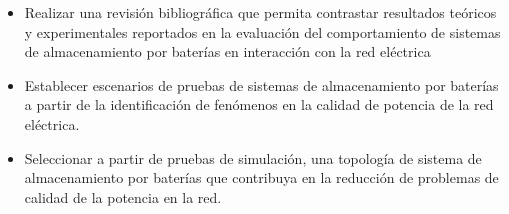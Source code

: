 
\begin{itemize}
    \item Realizar una revisión bibliográfica que permita contrastar resultados teóricos y experimentales reportados en la evaluación del comportamiento de sistemas de almacenamiento por baterías en interacción con la red eléctrica
    \item Establecer escenarios de pruebas de sistemas de almacenamiento por baterías a partir de la identificación de fenómenos en la calidad de potencia de la red eléctrica.
    \item Seleccionar a partir de pruebas de simulación, una topología de sistema de almacenamiento por baterías que contribuya en la reducción de problemas de calidad de la potencia en la red.
    
\end{itemize}